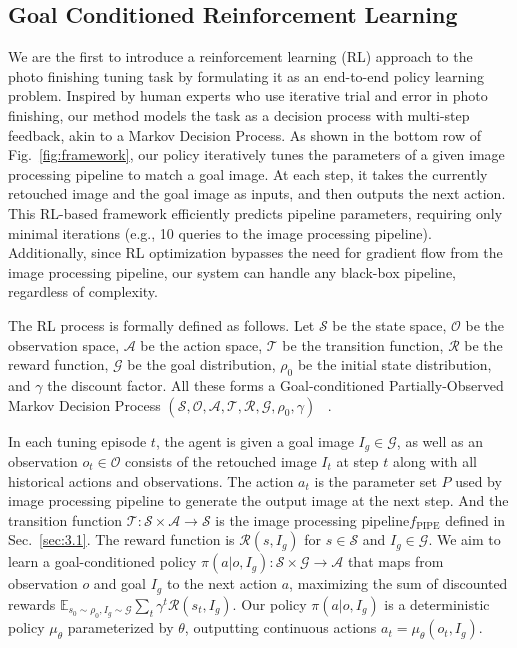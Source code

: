 \documentclass{article}
\newcommand{\pipeline}{image processing pipeline\xspace}
\newcommand{\task}{photo finishing tuning\xspace}
\begin{document}
\vspace{-4pt}
\subsection{Goal Conditioned Reinforcement Learning}
\vspace{-6pt}


We are the first to introduce a reinforcement learning (RL) approach to the \task task by formulating it as an end-to-end policy learning problem. Inspired by human experts who use iterative trial and error in photo finishing, our method models the task as a decision process with multi-step feedback, akin to a Markov Decision Process. As shown in the bottom row of Fig.~\ref{fig:framework}, our policy iteratively tunes the parameters of a given \pipeline to match a goal image. At each step, it takes the currently retouched image and the goal image as inputs, and then outputs the next action. This RL-based framework efficiently predicts pipeline parameters, requiring only minimal iterations (e.g., 10 queries to the \pipeline). Additionally, since RL optimization bypasses the need for gradient flow from the image processing pipeline, our system can handle any black-box pipeline, regardless of complexity. 

The RL process is formally defined as follows. Let $ \mathcal{S}$ be the state space, $\mathcal{O}$ be the observation space, $\mathcal{A}$ be the action space, $\mathcal{T}$ be the transition function, $\mathcal{R}$ be the reward function, $\mathcal{G}$ be the goal distribution, $\rho_0$ be the initial state distribution, and $\gamma$ the discount factor. All these forms a Goal-conditioned Partially-Observed Markov Decision Process $ \left( \mathcal{S}, \mathcal{O}, \mathcal{A}, \mathcal{T}, \mathcal{R}, \mathcal{G}, \rho_0, \gamma \right)$ ~\cite{liu2022goalconditioned}.

In each tuning episode $t$, the agent is given a goal image $I_g \in \mathcal{G}$, as well as an observation $o_t \in \mathcal{O}$ consists of the retouched image $I_t$ at step $t$ along with all historical actions and observations.
The action $a_t$ is the parameter set $P$ used by \pipeline to generate the output image at the next step. And the transition function $\mathcal{T}: \mathcal{S} \times \mathcal{A} \rightarrow \mathcal{S}$ is the \pipeline $f_{\text{PIPE}}$ defined in Sec.~\ref{sec:3.1}. 
The reward function is $ \mathcal{R}(s, I_g) $ for $ s \in \mathcal{S}$ and $ I_g \in \mathcal{G}$. 
We aim to learn a goal-conditioned policy $ \pi(a | o , I_g): \mathcal{S} \times \mathcal{G} \rightarrow \mathcal{A}$ that maps from observation $o$ and goal $I_g$ to the next action $a$, maximizing the sum of discounted rewards $ \mathbb{E}_{s_0 \sim \rho_0, I_g \sim \mathcal{G}} \sum_{t} \gamma^{t} \mathcal{R}(s_t, I_g)$.  
Our policy $\pi(a | o, I_g)$ is a deterministic policy $\mu_\theta$ parameterized by $\theta$, outputting continuous actions $a_t = \mu_\theta(o_t, I_g)$. 
\end{document}
